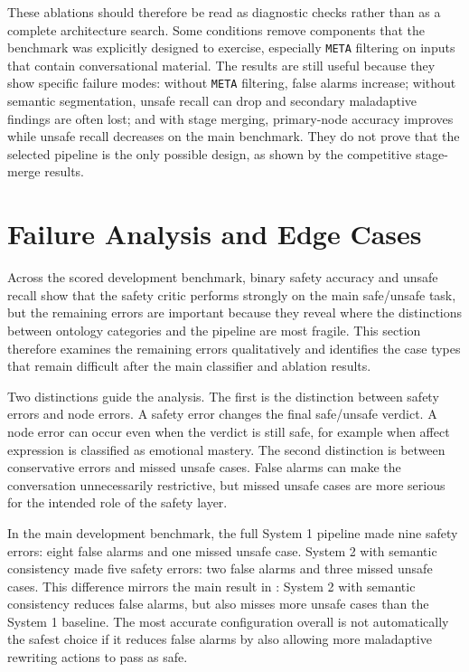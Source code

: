 These ablations should therefore be read as diagnostic checks rather than as a complete
architecture search. Some conditions remove components that the benchmark was explicitly
designed to exercise, especially \texttt{META} filtering on inputs that contain
conversational material. The results are still useful because they show specific failure
modes: without \texttt{META} filtering, false alarms increase; without semantic
segmentation, unsafe recall can drop and secondary maladaptive findings are often lost;
and with stage merging, primary-node accuracy improves while unsafe recall decreases on
the main benchmark. They do not prove that the selected pipeline is the only possible
design, as shown by the competitive stage-merge results.

\section{Failure Analysis and Edge Cases}

Across the scored development benchmark, binary safety accuracy and unsafe recall show
that the safety critic performs strongly on the main safe/unsafe task, but the remaining
errors are important because they reveal where the distinctions between ontology
categories and the pipeline are most fragile. This section therefore examines the
remaining errors qualitatively and identifies the case types that remain difficult after
the main classifier and ablation results.

Two distinctions guide the analysis. The first is the distinction between safety errors
and node errors. A safety error changes the final safe/unsafe verdict. A node error can
occur even when the verdict is still safe, for example when affect expression is
classified as emotional mastery. The second distinction is between conservative errors
and missed unsafe cases. False alarms can make the conversation unnecessarily
restrictive, but missed unsafe cases are more serious for the intended role of the
safety layer.

In the main development benchmark, the full System 1 pipeline made nine safety errors:
eight false alarms and one missed unsafe case. System 2 with semantic consistency made
five safety errors: two false alarms and three missed unsafe cases. This difference
mirrors the main result in : System 2 with semantic
consistency reduces false alarms, but also misses more unsafe cases than the System 1
baseline. The most accurate configuration overall is not automatically the safest
choice if it reduces false alarms by also allowing more maladaptive rewriting actions
to pass as safe.


